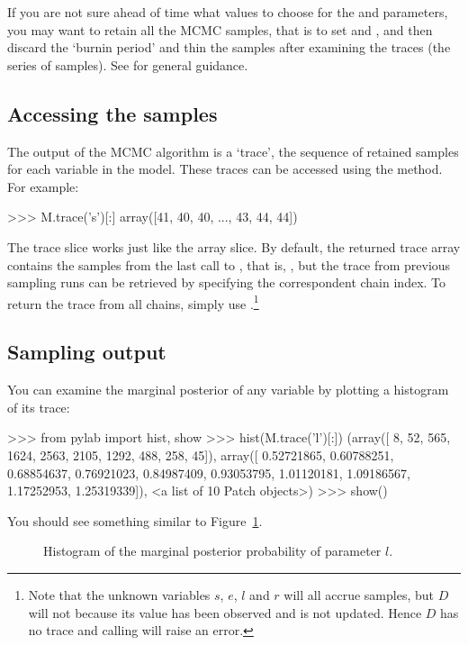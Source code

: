\documentclass[]{jss}
\begin{document}
If you are not sure ahead of time what values to choose for the  and  parameters, you may want to retain all the MCMC samples, that is to set  and , and then discard the `burnin period' and thin the samples after examining the traces (the series of samples). See \citet{gelman} for general guidance.

\subsection{Accessing the samples}
The output of the MCMC algorithm is a `trace', the sequence of retained
samples for each variable in the model. These traces can be accessed
using the  method. For example:
\begin{CodeInput}
>>> M.trace('s')[:]
array([41, 40, 40, ..., 43, 44, 44])
\end{CodeInput}
The trace slice  works just like the  array
slice. By default, the returned trace array contains the samples from the
last call to , that is, , but the trace from
previous sampling runs can be retrieved by specifying the correspondent
chain index. To return the trace from all chains, simply use
.\footnote{Note that the unknown variables $s$, $e$, $l$ and $r$ will all
accrue samples, but $D$ will not because its value has been observed and is
not updated. Hence $D$ has no trace and calling  will
raise an error. }


\subsection{Sampling output}
You can examine the marginal posterior of any variable by plotting a histogram of its trace:
\begin{CodeInput}
>>> from pylab import hist, show
>>> hist(M.trace('l')[:])
(array([   8,   52,  565, 1624, 2563, 2105, 1292,  488,  258,   45]),
array([ 0.52721865,  0.60788251,  0.68854637,  0.76921023,  0.84987409,
       0.93053795,  1.01120181,  1.09186567,  1.17252953,  1.25319339]),
<a list of 10 Patch objects>)
>>> show()
\end{CodeInput}
You should see something similar to Figure~\ref{fig:hist}.
\begin{figure}[h!]
\begin{center}
   \caption{Histogram of the marginal posterior probability of parameter $l$.}
	\label{fig:hist}
\end{center}
\end{figure}
\end{document}
